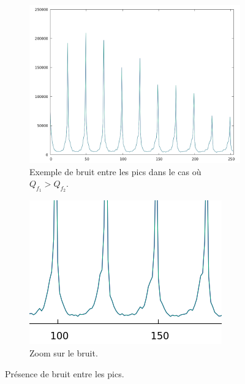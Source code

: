 \documentclass[utf8,final]{stageM2R} %
\begin{document}
\begin{figure}
  \begin{subfigure}{.5\textwidth}
    \centering
    \includegraphics[width=\linewidth]{images/signal_noise}
    \caption{Exemple de bruit entre les pics dans le cas où $Q_{f_1} > Q_{f_2}$.}
  \end{subfigure}
  \begin{subfigure}{.5\textwidth}
    \centering
    \includegraphics[width=\linewidth]{images/signal_noise_zoom}
    \caption{Zoom sur le bruit.}
  \end{subfigure}
  \caption{Présence de bruit entre les pics.}
  \label{fig:signal_noise}
\end{figure}
\end{document}
